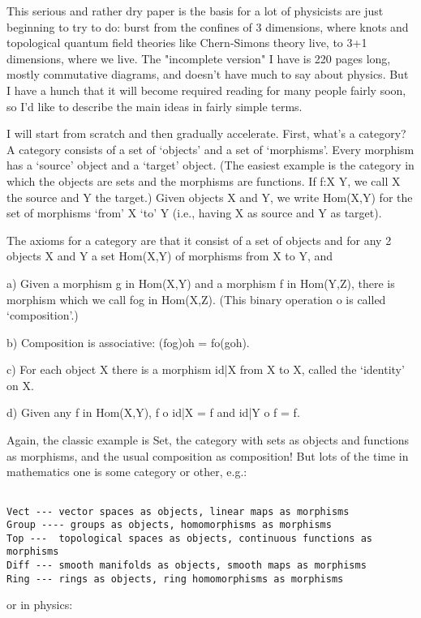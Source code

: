 This serious and rather dry paper is the basis for a lot of 
physicists are just beginning to try to do: burst from the confines of 3
dimensions, where knots and topological quantum field theories like
Chern-Simons theory live, to 3+1 dimensions, where we live.  The
"incomplete version" I have is 220 pages long, mostly commutative
diagrams, and doesn't have much to say about physics.  But I have a hunch
that it will become required reading for many people fairly soon, so 
I'd like to describe the main ideas in fairly simple terms.  

I will start from scratch and then gradually accelerate.  First, what's
a category?  A category consists of a set of `objects' and a set of
`morphisms'.  Every morphism has a `source' object and a `target'
object.  (The easiest example is the category in which the objects
are sets and the morphisms are functions.  If f:X \to  Y, we call X the
source and Y the target.)  Given objects X and Y, we write Hom(X,Y)
for the set of morphisms `from' X `to' Y (i.e., having X as source and Y
as target).  

The axioms for a category are that it consist of a set of objects and
for any 2 objects X and Y a set Hom(X,Y) of morphisms from X to Y, and

a)  Given a morphism g in Hom(X,Y) and a morphism f in Hom(Y,Z), there
is morphism which we call fog in Hom(X,Z).  (This binary operation o is
called `composition'.)

b)  Composition is associative:  (fog)oh = fo(goh).

c)  For each object X there is a morphism id|X from X to X, called the
`identity' on X.

d)  Given any f in Hom(X,Y), f o id|X = f and id|Y o f = f.

Again, the classic example is Set, the category with sets as objects and
functions as morphisms, and the usual composition as composition!
But lots of the time in mathematics one is some category or other, e.g.:


\begin{verbatim}

Vect --- vector spaces as objects, linear maps as morphisms
Group ---- groups as objects, homomorphisms as morphisms
Top ---  topological spaces as objects, continuous functions as morphisms
Diff --- smooth manifolds as objects, smooth maps as morphisms
Ring --- rings as objects, ring homomorphisms as morphisms
\end{verbatim}
    

or in physics:


